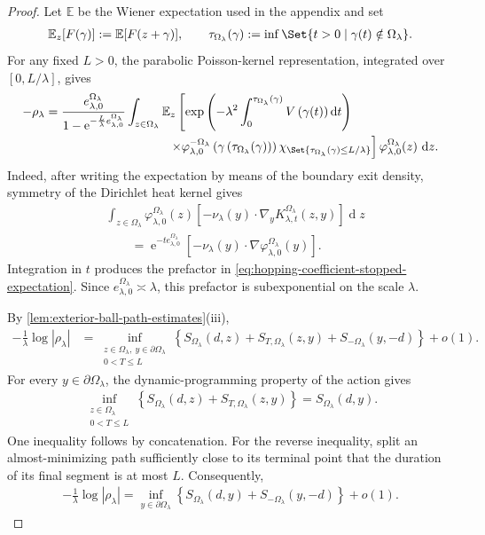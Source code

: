 \documentclass[a4paper,10pt]{article}
\numberwithin{equation}{section}
\theoremstyle{plain}
\theoremstyle{plain}
\theoremstyle{plain}
\theoremstyle{plain}
\theoremstyle{plain}
\theoremstyle{remark}
\theoremstyle{definition}
\newcommand{\ee}{\operatorname{e}}
\newcommand{\EE}{\mathbb{E}}
\newcommand{\dif}{\operatorname{d}\!} %
\newcommand{\vf}{\varphi}
\newcommand{\abs}[1]{\left\lvert#1\right\rvert}
\newcommand{\eq}[1]{\begin{align*}#1\end{align*}}
\newcommand{\eql}[1]{\begin{align}#1\end{align}}
\newcommand{\br}[1]{\left(#1\right)}
\begin{document}
\begin{proof}
Let $\EE$ be the Wiener expectation used in the appendix and set
\eq{
\EE_z[F(\gamma)]
:=
\EE[F(z+\gamma)],
\qquad
\tau_{\Omega_\lambda}(\gamma)
:=
\inf\Set{t>0\mid\gamma(t)\notin\Omega_\lambda}.
}
For any fixed $L>0$, the parabolic Poisson-kernel representation,
integrated over $[0,L/\lambda]$, gives
\eql{
-\rho_\lambda
&=
\frac{e_{\lambda,0}^{\Omega_\lambda}}
{1-\ee^{-\frac{L}{\lambda}e_{\lambda,0}^{\Omega_\lambda}}}
\int_{z\in\Omega_\lambda}
\EE_z\left[
\exp\left(
-\lambda^2
\int_0^{\tau_{\Omega_\lambda}(\gamma)}
V\br{\gamma(t)}\dif{t}
\right)
\right.
\nonumber\\
&\hspace{10em}\left.
\times
\vf_{\lambda,0}^{-\Omega_\lambda}
\br{\gamma\br{\tau_{\Omega_\lambda}(\gamma)}}
\chi_{\Set{
\tau_{\Omega_\lambda}(\gamma)\leq L/\lambda
}}
\right]
\vf_{\lambda,0}^{\Omega_\lambda}(z)\,\dif{z}.
\label{eq:hopping-coefficient-stopped-expectation}
}
Indeed, after writing the expectation by means of the boundary exit
density, symmetry of the Dirichlet heat kernel gives
\eq{
&\int_{z\in\Omega_\lambda}
\vf_{\lambda,0}^{\Omega_\lambda}(z)
\left[
-\nu_\lambda(y)\cdot
\nabla_yK_{\lambda,t}^{\Omega_\lambda}(z,y)
\right]
\dif z
\\
&\qquad=
\ee^{-t e_{\lambda,0}^{\Omega_\lambda}}
\left[
-\nu_\lambda(y)\cdot
\nabla\vf_{\lambda,0}^{\Omega_\lambda}(y)
\right].
}
Integration in $t$ produces the prefactor in
\cref{eq:hopping-coefficient-stopped-expectation}. Since
$e_{\lambda,0}^{\Omega_\lambda}\asymp\lambda$, this prefactor is
subexponential on the scale $\lambda$.

By \cref{lem:exterior-ball-path-estimates}(iii),
\eq{
-\frac1\lambda\log\abs{\rho_\lambda}
&=
\inf_{\substack{
z\in\Omega_\lambda,\ y\in\partial\Omega_\lambda\\
0<T\leq L
}}
\left\{
S_{\Omega_\lambda}(d,z)
+S_{T,\Omega_\lambda}(z,y)
+S_{-\Omega_\lambda}(y,-d)
\right\}
+o(1).
}
For every $y\in\partial\Omega_\lambda$, the dynamic-programming property
of the action gives
\eq{
\inf_{\substack{z\in\Omega_\lambda\\0<T\leq L}}
\left\{
S_{\Omega_\lambda}(d,z)
+S_{T,\Omega_\lambda}(z,y)
\right\}
=
S_{\Omega_\lambda}(d,y).
}
One inequality follows by concatenation. For the reverse inequality,
split an almost-minimizing path sufficiently close to its terminal point
that the duration of its final segment is at most $L$. Consequently,
\eql{
-\frac1\lambda\log\abs{\rho_\lambda}
=
\inf_{y\in\partial\Omega_\lambda}
\left\{
S_{\Omega_\lambda}(d,y)
+S_{-\Omega_\lambda}(y,-d)
\right\}
+o(1).
\label{eq:hopping-action-through-boundary}
}


\end{proof}
\end{document}
